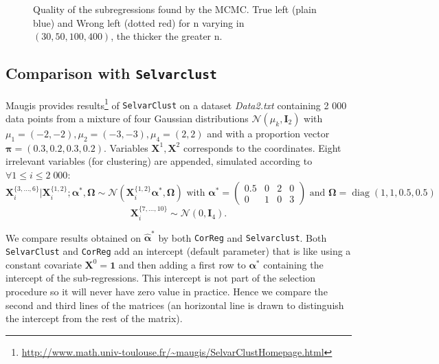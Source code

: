 \documentclass[12pt,a4paper]{report}
\begin{document}
\begin{figure}[h!]
	 \quad
	\caption{Quality of the subregressions found by the MCMC. True left (plain blue) and Wrong left (dotted red) for n varying in $(30,50,100,400)$, the thicker the greater n.}\label{compZBIC}
\end{figure}


\subsection{Comparison with {\tt Selvarclust}}\label{compMaugis}
		Maugis provides results\footnote{\url{http://www.math.univ-toulouse.fr/~maugis/SelvarClustHomepage.html}} of {\tt SelvarClust} on a dataset {\it Data2.txt} containing 2 000 data points from a mixture of four Gaussian distributions $\mathcal{N}(\mu_k,\boldsymbol{I}_2)$ with $\mu_1=(-2,-2),\mu_2=(-3,-3),\mu_4=(2,2)$ and with a proportion vector $\boldsymbol{\pi}=(0.3,0.2,0.3,0.2)$. Variables $\boldsymbol{X}^1,\boldsymbol{X}^2$ corresponds to the coordinates. Eight irrelevant variables (for clustering) are appended, simulated according to $\forall 1\leq i \leq 2\; 000$:
		\begin{displaymath}
		 \boldsymbol{X}_i^{\{3,\dots , 6 \}}|\boldsymbol{X}_i^{\{1,2\}};\boldsymbol{\alpha}^*,\boldsymbol{\Omega} \sim \mathcal{N}(\boldsymbol{X}_i^{\{1,2\}}\boldsymbol{\alpha^*},\boldsymbol{\Omega})
		 \textrm{ with } \boldsymbol{\alpha}^*= \left( \begin{array}{cccc}
		0.5 & 0 & 2 & 0 \\ 
		0 & 1 & 0 & 3
		\end{array} \right) \textrm{ and } \boldsymbol{\Omega}=\operatorname{diag}(1,1,0.5,0.5)
		\end{displaymath}
		\begin{displaymath}
		 \boldsymbol{X}_i^{\{7,\dots , 10 \}}\sim \mathcal{N}(0,\boldsymbol{I}_4).
		\end{displaymath}

We compare results obtained on	$\hat{\boldsymbol{\alpha}}^*$ by both {\tt CorReg} and {\tt Selvarclust}.		
Both {\tt SelvarClust} and {\tt CorReg} add an intercept (default parameter) that is like using a constant covariate $\boldsymbol{X}^0=\boldsymbol{1}$ and then adding a first row to $\boldsymbol{\alpha}^*$ containing the intercept of the sub-regressions. This intercept is not part of the selection procedure so it will never have zero value in practice. Hence we compare the second and third lines of the matrices (an horizontal line is drawn to distinguish the intercept from the rest of the matrix).\\
\end{document}
